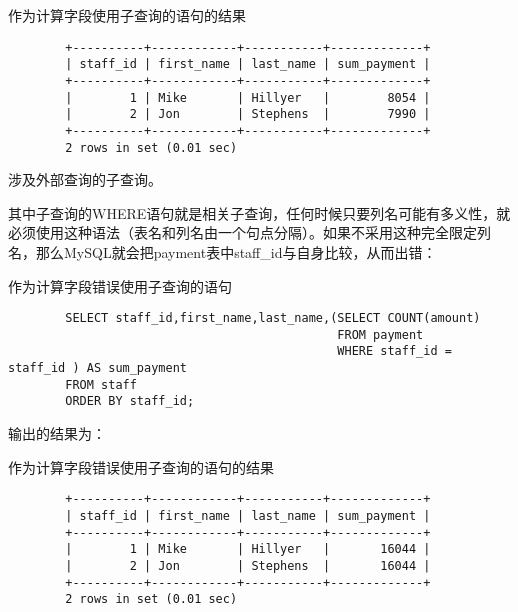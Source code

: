 \documentclass[UTF8]{article}
\begin{document}
\begin{listing}[H]
	\caption{作为计算字段使用子查询的语句的结果}
	\label{code:asculculatiousesubqueryclauseresult}
\begin{verbatim}
        +----------+------------+-----------+-------------+
        | staff_id | first_name | last_name | sum_payment |
        +----------+------------+-----------+-------------+
        |        1 | Mike       | Hillyer   |        8054 |
        |        2 | Jon        | Stephens  |        7990 |
        +----------+------------+-----------+-------------+
        2 rows in set (0.01 sec)
\end{verbatim}
\end{listing}

\begin{redbox}[frametitle={Defination 14.2.1 相关子查询（correlated subquery）}]
        涉及外部查询的子查询。
\end{redbox}

其中子查询的WHERE语句就是相关子查询，任何时候只要列名可能有多义性，就必须使用这种语法（表名和列名由一个句点分隔）。如果不采用这种完全限定列名，那么MySQL就会把payment表中staff\_id与自身比较，从而出错：
\begin{listing}[H]
	\caption{作为计算字段错误使用子查询的语句}
	\label{code:asculculationusesubqueryfaultclause}
\begin{verbatim}
        SELECT staff_id,first_name,last_name,(SELECT COUNT(amount) 
                                              FROM payment 
                                              WHERE staff_id = staff_id ) AS sum_payment 
        FROM staff 
        ORDER BY staff_id;
\end{verbatim}
\end{listing}

输出的结果为：

\begin{listing}[H]
	\caption{作为计算字段错误使用子查询的语句的结果}
	\label{code:asculculatiousesubqueryfaultclauseresult}
\begin{verbatim}
        +----------+------------+-----------+-------------+
        | staff_id | first_name | last_name | sum_payment |
        +----------+------------+-----------+-------------+
        |        1 | Mike       | Hillyer   |       16044 |
        |        2 | Jon        | Stephens  |       16044 |
        +----------+------------+-----------+-------------+
        2 rows in set (0.01 sec)
\end{verbatim}
\end{listing}
\end{document}
